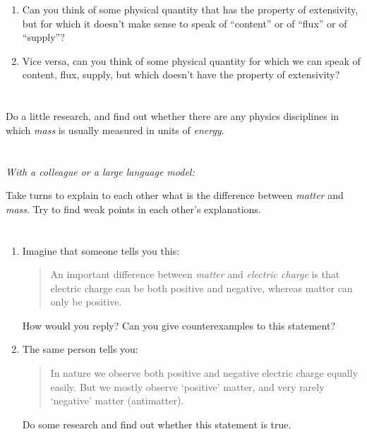 \documentclass[a4paper,12pt,%
onecolumn,oneside,%
british%
]{memoir}
\newcommand{\elabel}[1]{\label{#1}\marginpar{\vspace{-1.3\baselineskip}\hspace{-8em}\footnotesize Solution p.~\pageref{#1_sol}}}
\renewcommand*{\|}[1][]{\nonscript\:#1\vert\nonscript\:\mathopen{}}
\begin{document}
\begin{enumerate}[exerc]
\item Can you think of some physical quantity that has the property of extensivity, but for which it doesn't make sense to speak of \enquote{content} or of \enquote{flux} or of \enquote{supply}?

\item Vice versa, can you think of some physical quantity for which we can speak of content, flux, supply, but which doesn't have the property of extensivity?
\end{enumerate}

\section{}\elabel{sec:energy_meas_mass}

Do a little research, and find out whether there are any physics disciplines in which \emph{mass} is usually measured in units of \emph{energy}.

\section{}\label{sec:diff_mass_matter}

\emph{With a colleague or a large language model:}

\smallskip

Take turns to explain to each other what is the difference between \emph{matter} and \emph{mass}. Try to find weak points in each other's explanations.


\section{}\label{sec:neg_matter}

\begin{enumerate}[exerc]
\item Imagine that someone tells you this:
  \begin{quote}
    An important difference between \emph{matter} and \emph{electric charge} is that electric charge can be both positive and negative, whereas matter can only be positive.
  \end{quote}
  How would you reply? Can you give counterexamples to this statement?

\item The same person tells you:
  \begin{quote}
    In nature we observe both positive and negative electric charge equally easily. But we mostly observe \enquote*{positive} matter, and very rarely \enquote*{negative} matter (antimatter).
  \end{quote}
  Do some research and find out whether this statement is true.
\end{enumerate}
\end{document}
